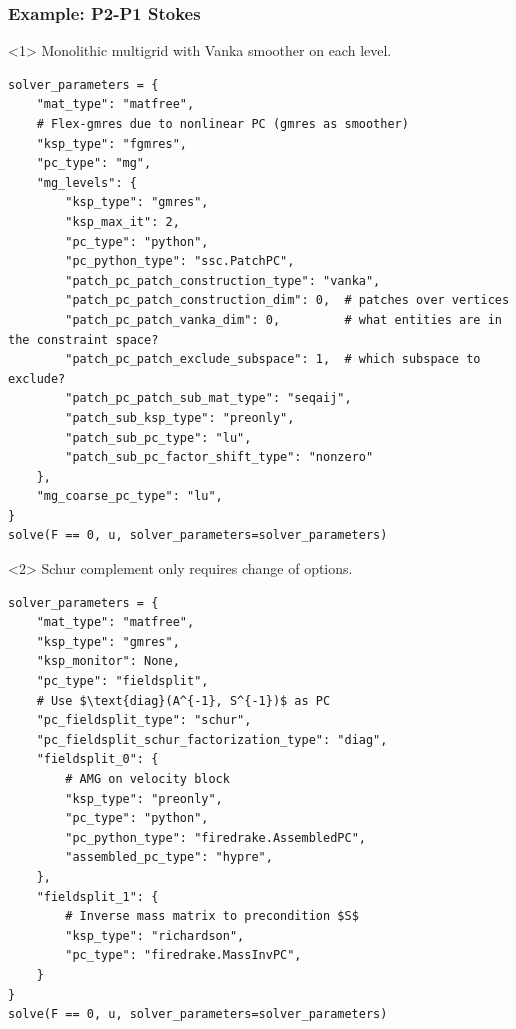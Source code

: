 \documentclass[presentation,aspectratio=43]{beamer}
\begin{document}
\begin{frame}[fragile]
  \frametitle{Example: P2-P1 Stokes}
  \begin{onlyenv}<1>
    Monolithic multigrid with Vanka smoother on each level.
\begin{verbatim}
solver_parameters = {
    "mat_type": "matfree",
    # Flex-gmres due to nonlinear PC (gmres as smoother)
    "ksp_type": "fgmres",
    "pc_type": "mg",
    "mg_levels": {
        "ksp_type": "gmres",
        "ksp_max_it": 2,
        "pc_type": "python",
        "pc_python_type": "ssc.PatchPC",
        "patch_pc_patch_construction_type": "vanka",
        "patch_pc_patch_construction_dim": 0,  # patches over vertices
        "patch_pc_patch_vanka_dim": 0,         # what entities are in the constraint space?
        "patch_pc_patch_exclude_subspace": 1,  # which subspace to exclude?
        "patch_pc_patch_sub_mat_type": "seqaij",
        "patch_sub_ksp_type": "preonly",
        "patch_sub_pc_type": "lu",
        "patch_sub_pc_factor_shift_type": "nonzero"
    },
    "mg_coarse_pc_type": "lu",
}
solve(F == 0, u, solver_parameters=solver_parameters)
\end{verbatim}
  \end{onlyenv}
  \begin{onlyenv}<2>
    Schur complement only requires change of options.
\begin{verbatim}
solver_parameters = {
    "mat_type": "matfree",
    "ksp_type": "gmres",
    "ksp_monitor": None,
    "pc_type": "fieldsplit",
    # Use $\text{diag}(A^{-1}, S^{-1})$ as PC
    "pc_fieldsplit_type": "schur",
    "pc_fieldsplit_schur_factorization_type": "diag",
    "fieldsplit_0": {
        # AMG on velocity block
        "ksp_type": "preonly",
        "pc_type": "python",
        "pc_python_type": "firedrake.AssembledPC",
        "assembled_pc_type": "hypre",
    },
    "fieldsplit_1": {
        # Inverse mass matrix to precondition $S$
        "ksp_type": "richardson",
        "pc_type": "firedrake.MassInvPC",
    }
}
solve(F == 0, u, solver_parameters=solver_parameters)
\end{verbatim}
  \end{onlyenv}
\end{frame}
\end{document}
